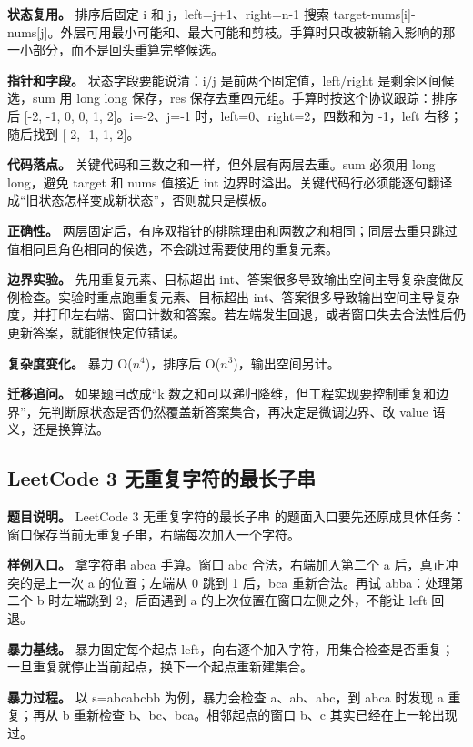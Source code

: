 \textbf{状态复用。} 排序后固定 i 和 j，left=j+1、right=n-1 搜索 target-nums[i]-nums[j]。外层可用最小可能和、最大可能和剪枝。手算时只改被新输入影响的那一小部分，而不是回头重算完整候选。

\textbf{指针和字段。} 状态字段要能说清：i/j 是前两个固定值，left/right 是剩余区间候选，sum 用 long long 保存，res 保存去重四元组。手算时按这个协议跟踪：排序后 [-2, -1, 0, 0, 1, 2]。i=-2、j=-1 时，left=0、right=2，四数和为 -1，left 右移；随后找到 [-2, -1, 1, 2]。

\textbf{代码落点。} 关键代码和三数之和一样，但外层有两层去重。sum 必须用 long long，避免 target 和 nums 值接近 int 边界时溢出。关键代码行必须能逐句翻译成“旧状态怎样变成新状态”，否则就只是模板。

\textbf{正确性。} 两层固定后，有序双指针的排除理由和两数之和相同；同层去重只跳过值相同且角色相同的候选，不会跳过需要使用的重复元素。

\textbf{边界实验。} 先用重复元素、目标超出 int、答案很多导致输出空间主导复杂度做反例检查。实验时重点跑重复元素、目标超出 int、答案很多导致输出空间主导复杂度，并打印左右端、窗口计数和答案。若左端发生回退，或者窗口失去合法性后仍更新答案，就能很快定位错误。

\textbf{复杂度变化。} 暴力 O(\ensuremath{n^{4}})，排序后 O(\ensuremath{n^{3}})，输出空间另计。

\textbf{迁移追问。} 如果题目改成“k 数之和可以递归降维，但工程实现要控制重复和边界”，先判断原状态是否仍然覆盖新答案集合，再决定是微调边界、改 value 语义，还是换算法。

\subsection{LeetCode 3 无重复字符的最长子串}

\textbf{题目说明。} LeetCode 3 无重复字符的最长子串 的题面入口要先还原成具体任务：窗口保存当前无重复子串，右端每次加入一个字符。

\textbf{样例入口。} 拿字符串 abca 手算。窗口 abc 合法，右端加入第二个 a 后，真正冲突的是上一次 a 的位置；左端从 0 跳到 1 后，bca 重新合法。再试 abba：处理第二个 b 时左端跳到 2，后面遇到 a 的上次位置在窗口左侧之外，不能让 left 回退。

\textbf{暴力基线。} 暴力固定每个起点 left，向右逐个加入字符，用集合检查是否重复；一旦重复就停止当前起点，换下一个起点重新建集合。

\textbf{暴力过程。} 以 s=abcabcbb 为例，暴力会检查 a、ab、abc，到 abca 时发现 a 重复；再从 b 重新检查 b、bc、bca。相邻起点的窗口 b、c 其实已经在上一轮出现过。

